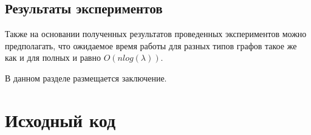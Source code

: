 \documentclass[times]{itmo-student-thesis}
\begin{document}
\section{Результаты экспериментов}

\chapterconclusion
Также на основании полученных результатов проведенных экспериментов можно предполагать, что ожидаемое время работы для разных типов графов такое же как и для полных и равно $O(nlog(\lambda))$.

\startconclusionpage

В данном разделе размещается заключение.

\printmainbibliography

\appendix

\chapter{Исходный код}\label{sec:app:1}
\end{document}
